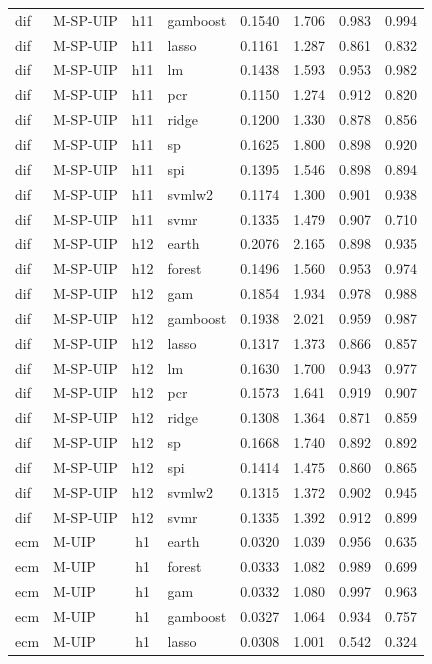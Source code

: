\begin{ThreePartTable}
\begin{longtable}[t]{llclcccc}
dif & M-SP-UIP & h11 & gamboost & 0.1540 & 1.706 & 0.983 & 0.994\\
dif & M-SP-UIP & h11 & lasso & 0.1161 & 1.287 & 0.861 & 0.832\\
dif & M-SP-UIP & h11 & lm & 0.1438 & 1.593 & 0.953 & 0.982\\
dif & M-SP-UIP & h11 & pcr & 0.1150 & 1.274 & 0.912 & 0.820\\
dif & M-SP-UIP & h11 & ridge & 0.1200 & 1.330 & 0.878 & 0.856\\
dif & M-SP-UIP & h11 & sp & 0.1625 & 1.800 & 0.898 & 0.920\\
dif & M-SP-UIP & h11 & spi & 0.1395 & 1.546 & 0.898 & 0.894\\
dif & M-SP-UIP & h11 & svmlw2 & 0.1174 & 1.300 & 0.901 & 0.938\\
dif & M-SP-UIP & h11 & svmr & 0.1335 & 1.479 & 0.907 & 0.710\\
\addlinespace
dif & M-SP-UIP & h12 & earth & 0.2076 & 2.165 & 0.898 & 0.935\\
dif & M-SP-UIP & h12 & forest & 0.1496 & 1.560 & 0.953 & 0.974\\
dif & M-SP-UIP & h12 & gam & 0.1854 & 1.934 & 0.978 & 0.988\\
dif & M-SP-UIP & h12 & gamboost & 0.1938 & 2.021 & 0.959 & 0.987\\
dif & M-SP-UIP & h12 & lasso & 0.1317 & 1.373 & 0.866 & 0.857\\
dif & M-SP-UIP & h12 & lm & 0.1630 & 1.700 & 0.943 & 0.977\\
dif & M-SP-UIP & h12 & pcr & 0.1573 & 1.641 & 0.919 & 0.907\\
dif & M-SP-UIP & h12 & ridge & 0.1308 & 1.364 & 0.871 & 0.859\\
dif & M-SP-UIP & h12 & sp & 0.1668 & 1.740 & 0.892 & 0.892\\
dif & M-SP-UIP & h12 & spi & 0.1414 & 1.475 & 0.860 & 0.865\\
dif & M-SP-UIP & h12 & svmlw2 & 0.1315 & 1.372 & 0.902 & 0.945\\
dif & M-SP-UIP & h12 & svmr & 0.1335 & 1.392 & 0.912 & 0.899\\
\addlinespace
ecm & M-UIP & h1 & earth & 0.0320 & 1.039 & 0.956 & 0.635\\
ecm & M-UIP & h1 & forest & 0.0333 & 1.082 & 0.989 & 0.699\\
ecm & M-UIP & h1 & gam & 0.0332 & 1.080 & 0.997 & 0.963\\
ecm & M-UIP & h1 & gamboost & 0.0327 & 1.064 & 0.934 & 0.757\\
ecm & M-UIP & h1 & lasso & 0.0308 & 1.001 & 0.542 & 0.324\\

\end{longtable}
\end{ThreePartTable}
